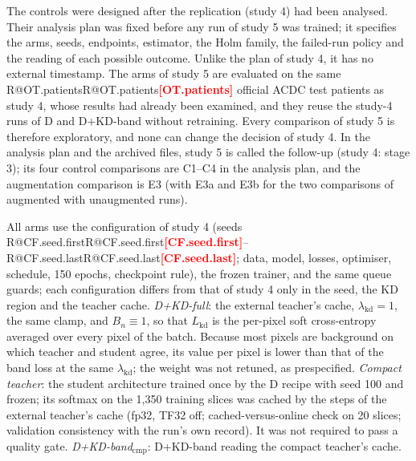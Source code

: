 \documentclass[10pt]{article}
\makeatletter
\newcommand{\R}[1]{\ifcsname R@#1\endcsname\csname R@#1\endcsname\else\textbf{\textcolor{red}{[#1]}}\fi}
\renewcommand\paragraph{\@startsection{paragraph}{4}{\z@}{1.6ex \@plus .5ex \@minus .2ex}{-1em}{\normalfont\normalsize\bfseries}}
\makeatother
\begin{document}
\paragraph{Status.} The controls were designed after the replication (study 4) had been analysed. Their analysis plan was fixed before any run of study 5 was trained; it specifies the arms, seeds, endpoints, estimator, the Holm family, the failed-run policy and the reading of each possible outcome. Unlike the plan of study 4, it has no external timestamp. The arms of study 5 are evaluated on the same \R{OT.patients} official ACDC test patients as study 4, whose results had already been examined, and they reuse the study-4 runs of D and D+KD-band without retraining. Every comparison of study 5 is therefore exploratory, and none can change the decision of study 4. In the analysis plan and the archived files, study 5 is called the follow-up (study 4: stage 3); its four control comparisons are C1--C4 in the analysis plan, and the augmentation comparison is E3 (with E3a and E3b for the two comparisons of augmented with unaugmented runs).

\paragraph{Arms.} All arms use the configuration of study 4 (seeds \R{CF.seed.first}--\R{CF.seed.last}; data, model, losses, optimiser, schedule, 150 epochs, checkpoint rule), the frozen trainer, and the same queue guards; each configuration differs from that of study 4 only in the seed, the KD region and the teacher cache. \emph{D+KD-full}: the external teacher's cache, $\lambda_{\mathrm{kd}}=1$, the same clamp, and $B_n\equiv1$, so that $L_{\mathrm{kd}}$ is the per-pixel soft cross-entropy averaged over every pixel of the batch. Because most pixels are background on which teacher and student agree, its value per pixel is lower than that of the band loss at the same $\lambda_{\mathrm{kd}}$; the weight was not retuned, as prespecified. \emph{Compact teacher}: the student architecture trained once by the D recipe with seed 100 and frozen; its softmax on the 1,350 training slices was cached by the steps of the external teacher's cache (fp32, TF32 off; cached-versus-online check on 20 slices; validation consistency with the run's own record). It was not required to pass a quality gate. \emph{D+KD-band}$_{\mathrm{cmp}}$: D+KD-band reading the compact teacher's cache.
\end{document}
